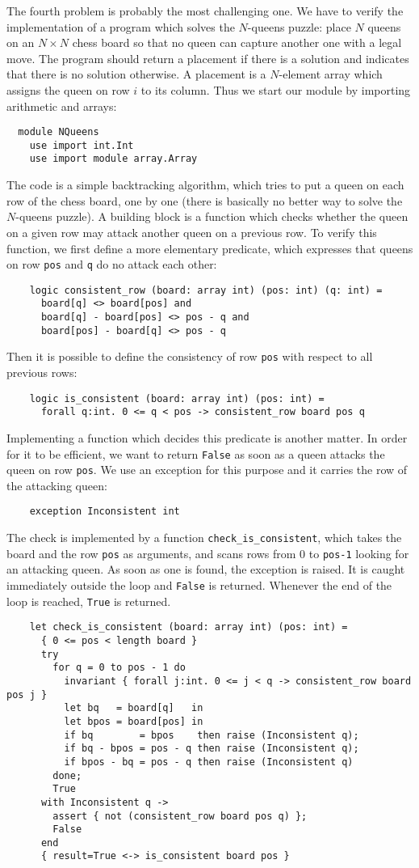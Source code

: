 The fourth problem is probably the most challenging one.
We have to verify the implementation of a program which solves the
$N$-queens puzzle: place $N$ queens on an $N \times N$
chess board so that no queen can capture another one with a
legal move.
The program should return a placement if there is a solution and
indicates that there is no solution otherwise. A placement is a
$N$-element array which assigns the queen on row $i$ to its column.
Thus we start our module by importing arithmetic and arrays:
\begin{verbatim}
  module NQueens
    use import int.Int
    use import module array.Array
\end{verbatim}
The code is a simple backtracking algorithm, which tries to put a queen
on each row of the chess board, one by one (there is basically no
better way to solve the $N$-queens puzzle).
A building block is a function which checks whether the queen on a
given row may attack another queen on a previous row. To verify this
function, we first define a more elementary predicate, which expresses
that queens on row \texttt{pos} and \texttt{q} do no attack each other:
\begin{verbatim}
    logic consistent_row (board: array int) (pos: int) (q: int) =
      board[q] <> board[pos] and
      board[q] - board[pos] <> pos - q and
      board[pos] - board[q] <> pos - q
\end{verbatim}
Then it is possible to define the consistency of row \texttt{pos}
with respect to all previous rows:
\begin{verbatim}
    logic is_consistent (board: array int) (pos: int) =
      forall q:int. 0 <= q < pos -> consistent_row board pos q
\end{verbatim}
Implementing a function which decides this predicate is another
matter. In order for it to be efficient, we want to return
\texttt{False} as soon as a queen attacks the queen on row
\texttt{pos}. We use an exception for this purpose and it carries the
row of the attacking queen:
\begin{verbatim}
    exception Inconsistent int
\end{verbatim}
The check is implemented by a function \verb|check_is_consistent|,
which takes the board and the row \texttt{pos} as arguments, and scans
rows from 0 to \texttt{pos-1} looking for an attacking queen. As soon
as one is found, the exception is raised. It is caught immediately
outside the loop and \texttt{False} is returned. Whenever the end of
the loop is reached, \texttt{True} is returned.
\begin{verbatim}
    let check_is_consistent (board: array int) (pos: int) =
      { 0 <= pos < length board }
      try
        for q = 0 to pos - 1 do
          invariant { forall j:int. 0 <= j < q -> consistent_row board pos j }
          let bq   = board[q]   in
          let bpos = board[pos] in
          if bq        = bpos    then raise (Inconsistent q);
          if bq - bpos = pos - q then raise (Inconsistent q);
          if bpos - bq = pos - q then raise (Inconsistent q)
        done;
        True
      with Inconsistent q ->
        assert { not (consistent_row board pos q) };
        False
      end
      { result=True <-> is_consistent board pos }
\end{verbatim}
